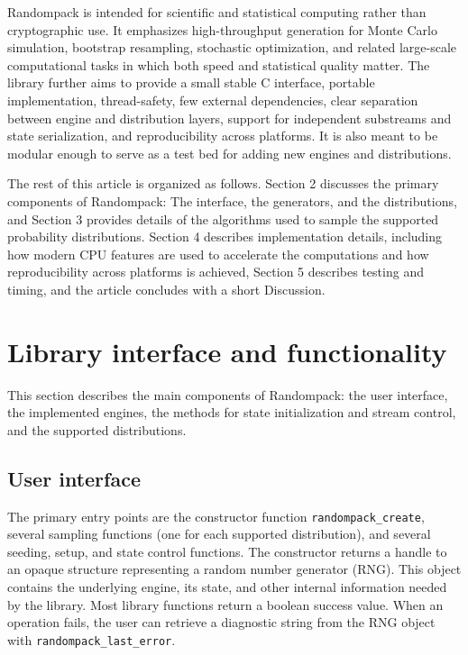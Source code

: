 \documentclass[manuscript,screen,review]{acmart}
\begin{document}
Randompack is intended for scientific and statistical computing rather
than cryptographic use. It emphasizes high-throughput generation for
Monte Carlo simulation, bootstrap resampling, stochastic optimization,
and related large-scale computational tasks in which both speed and
statistical quality matter. The library further aims to provide a
small stable C interface, portable implementation, thread-safety, few
external dependencies, clear separation between engine and
distribution layers, support for independent substreams and state
serialization, and reproducibility across platforms. It is also meant
to be modular enough to serve as a test bed for adding new engines and
distributions.

The rest of this article is organized as follows. Section 2 discusses
the primary components of Randompack: The interface, the generators,
and the distributions, and Section 3 provides details of the
algorithms used to sample the supported probability distributions.
Section 4 describes implementation details, including how modern CPU
features are used to accelerate the computations and how
reproducibility across platforms is achieved, Section 5 describes
testing and timing, and the article concludes with a short Discussion.

\section{Library interface and functionality}
This section describes the main components of Randompack: the user
interface, the implemented engines, the methods for state
initialization and stream control, and the supported distributions.

\subsection{User interface}
The primary entry points are the constructor function
\texttt{randompack\_create}, several sampling functions (one for each
supported distribution), and several seeding, setup, and state control
functions. The constructor returns a handle to an opaque structure
representing a random number generator (RNG). This object contains the
underlying engine, its state, and other internal information needed by
the library. Most library functions return a boolean success value.
When an operation fails, the user can retrieve a diagnostic string
from the RNG object with \texttt{randompack\_last\_error}.
\end{document}
